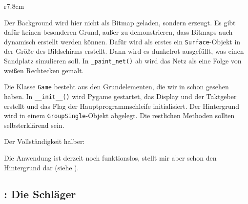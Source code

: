 
\begin{wrapfigure}[9]{r}{7.8cm}%
	\begin{center}%
		\vspace{-1cm}%
	\end{center}%
\end{wrapfigure}%
Der Background wird hier nicht als Bitmap geladen, sondern erzeugt. Es gibt dafür keinen besonderen Grund, außer zu demonstrieren, dass Bitmaps auch dynamisch erstellt werden können. Dafür wird als erstes ein \texttt{Surface}-Objekt in der Größe des Bildschirms erstellt. Dann wird es dunkelrot ausgefüllt, was einen Sandplatz simulieren soll. In \texttt{\_paint\_net()} ab  wird das Netz als eine Folge von weißen Rechtecken gemalt.


Die Klasse \texttt{Game} besteht aus den Grundelementen, die wir in  schon gesehen haben. In \texttt{\_\_init\_\_()} wird Pygame gestartet, das Display und der Taktgeber erstellt und das Flag der Hauptprogrammschleife initialisiert. Der Hintergrund wird in einem \texttt{Group\-Single}-Objekt abgelegt. Die restlichen Methoden sollten selbsterklärend sein.


Der Vollständigkeit halber: 


Die Anwendung ist derzeit noch funktionslos, stellt mir aber schon den Hintergrund dar (siehe ).

\subsection{: Die Schläger}

